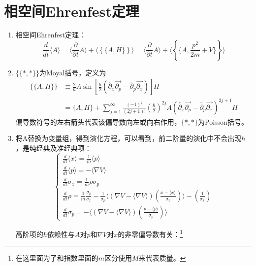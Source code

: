 \documentclass[12pt,a4paper,openany,twoside]{book}
\numberwithin{equation}{section}
\newcommand{\mean}[1]{\langle #1 \rangle}
\newcommand{\grad}{\nabla}
\begin{document}
\section{相空间Ehrenfest定理}
\begin{enumerate}
  \item 相空间Ehrenfest定理：
  \begin{equation}
  \frac{d}{dt}\mean{A}=\mean{\frac{\partial}{\partial t} A}+\mean{\left\{\{A,H\}\right\}}
  =\mean{\frac{\partial}{\partial t} A}+\mean{\left\{\{A,\frac{p^2}{2 m}+V\}\right\}}
  \end{equation}

  \item $\{\{*,*\}\}$为Moyal括号，定义为
  \begin{align}
  \{\{A,H\}\}&\equiv \frac{2}{\hbar}A \sin \left[\frac{\hbar}{2} (\overleftarrow{\partial_x}\overrightarrow{\partial_p}-\overleftarrow{\partial_p}\overrightarrow{\partial_x})\right]H\\
  &=\{A,H\}+\sum^\infty_{j=1}\frac{(-1)^j}{(2j+1)!}\left(\frac{\hbar}{2}\right)^{2j}A(\overleftarrow{\partial_x}\overrightarrow{\partial_p}-\overleftarrow{\partial_p}\overrightarrow{\partial_x})^{2j+1} H
  \end{align}
  偏导数符号的左右箭头代表该偏导数向左或向右作用，$\{*,*\}$为Poisson括号。

  \item 将A替换为变量组，得到演化方程，可以看到，前二阶量的演化中不会出现$\hbar$，是纯经典及准经典项：
  \begin{equation}
  \begin{cases}
  \frac{d}{dt}\mean{x}=\frac{1}{m}\mean{p}\\
  \frac{d}{dt}\mean{p}=-\mean{\grad V}\\
  \frac{d}{dt}\sigma_x = \frac{1}{m}\rho \sigma_p\\
  \frac{d}{dt} \rho = \frac{1}{m}\frac{\sigma_p}{\sigma_x} - \frac{1}{\sigma_p} \mean{(\grad V- \mean{\grad V })\left(\frac{x-\mean{x}}{\sigma_x}\right)}-\left(\frac{1}{\sigma_x}\right)\\
  \frac{d}{dt}\sigma_p=- \mean{(\grad V-\mean{\grad V })\left(\frac{p-\mean{p}}{\sigma_p}\right)}
  \end{cases}
  \end{equation}

  高阶项的$\hbar$依赖性与$A$对$p$和$\grad V$对$x$的非零偏导数有关：\footnote{在这里面为了和指数里面的$m$区分使用$M$来代表质量。}
  

\end{enumerate}
\end{document}
